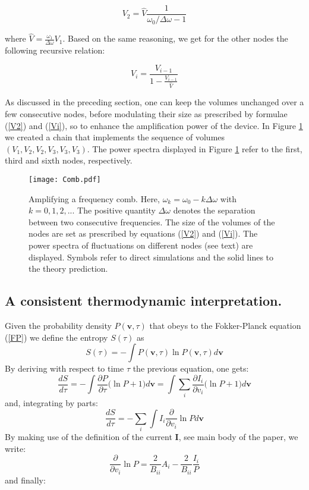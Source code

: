 \documentclass[showpacs,prl,superscriptaddress,nofootinbib, twocolumn]{revtex4}
\begin{document}
\begin{equation}
 \label{V2}
V_2=\hat{V} \frac{1}{\omega_0/\Delta \omega -1} 
\end{equation}

where $\hat{V}=\frac{\omega_1}{\Delta \omega}V_1$.  Based on the same reasoning, we get for the other nodes the following recursive relation:

\begin{equation}
 \label{Vi}
V_i= \frac{V_{i-1}}{1- \frac{V_{i-1}}{\hat{V}}} 
\end{equation}

As discussed in the preceding section, one can keep the volumes unchanged over a few consecutive nodes, before modulating their size as prescribed by formulae (\ref{V2}) and (\ref{Vi}), so to enhance the amplification power of the device. In Figure  \ref{fig5} we created a chain that implements the sequence of volumes $(V_1, V_2, V_2, V_3, V_3, V_3)$. The power spectra displayed in Figure  \ref{fig5}  refer to the first, third and sixth nodes, respectively.

\begin{figure}
 \centering
   {\texttt{[image: Comb.pdf]}}
   \caption{Amplifying a frequency comb. Here, $\omega_k=\omega_0- k \Delta \omega$ with $k=0,1,2,..$. The positive quantity $\Delta \omega$ denotes the separation between two consecutive frequencies. The size of the volumes of the nodes are set as prescribed by equations (\ref{V2}) and (\ref{Vi}). The power spectra of fluctuations on different nodes (see text) are displayed. Symbols refer to direct simulations and the solid lines to the theory prediction. }
   \label{fig5}
  \end{figure}

\subsection{A consistent thermodynamic interpretation.}


Given the  probability density $P({\boldsymbol v},\tau)$ that obeys to the Fokker-Planck equation (\ref{FP}) we define the entropy
$S(\tau)$ as
\[
S(\tau)=-\int P({\boldsymbol v},\tau)\ln P({\boldsymbol v},\tau) d{\boldsymbol v} 
\] 
By deriving with respect to time $\tau$ the previous equation, one gets:
\[
\frac{dS}{d\tau}=-\int \frac{\partial P}{\partial\tau}\big(\ln P+1\big) d{\boldsymbol v}=\int\sum_i \frac{\partial I_i}{\partial v_i} \big(\ln P+1\big) d{\boldsymbol v}
\]
and, integrating by parts:
\[
\frac{dS}{d\tau}=-\sum_i \int I_i \frac{\partial}{\partial v_i}\ln P d{\boldsymbol v}
\]
By making use of the definition of the current ${\boldsymbol I}$, see main body of the paper, we write: 
\[
\frac{\partial}{\partial v_i}\ln P=\frac{2}{B_{ii}}A_i-\frac{2}{B_{ii}}\frac{I_i}{P}
\]
and finally: 
\end{document}
